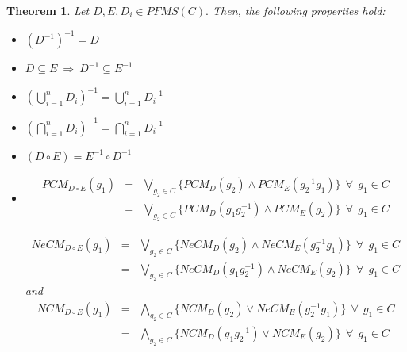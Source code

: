 \documentclass[10pt,a4paper]{amsart}
\newtheorem{theorem}{Theorem}
\newcommand{\dis}{\displaystyle}
\begin{document}
\begin{theorem}
Let $D, E, D_i \in PFMS(C).$ Then, the following properties hold:
\begin{itemize}
\item [i.] $(D^{-1})^{-1} = D$
\item [ii.] $D \subseteq E~\Rightarrow~D^{-1} \subseteq E^{-1}$
\item [iii.] $ \dis \left(\bigcup^n_{i = 1} D_i\right)^{-1} = \bigcup^n_{i = 1} D_i^{-1}$
\item [iv.] $\dis \left(\bigcap^n_{i = 1} D_i\right)^{-1} = \bigcap^n_{i = 1} D_i^{-1}$
\item [v.] $(D \circ E) = E^{-1} \circ D^{-1}$
\item [vi.] 
\begin{eqnarray*}
PCM_{D \circ E}(g_1) & = & \bigvee_{g_2 \in C} \lbrace PCM_D(g_2) \wedge PCM_E(g_2^{-1}g_1)\rbrace~~ \forall~~ g_1 \in C\\
& = & \bigvee_{g_2 \in C} \lbrace PCM_D(g_1 g^{-1}_2) \wedge PCM_E(g_2)\rbrace~~ \forall~~ g_1 \in C
\end{eqnarray*}

\begin{eqnarray*}
NeCM_{D \circ E}(g_1) & = & \bigvee_{g_2 \in C} \lbrace NeCM_D(g_2) \wedge NeCM_E(g_2^{-1}g_1)\rbrace~~ \forall~~ g_1 \in C\\
& = & \bigvee_{g_2 \in C} \lbrace NeCM_D(g_1 g^{-1}_2) \wedge NeCM_E(g_2)\rbrace~~ \forall~~ g_1 \in C
\end{eqnarray*}
and 
\begin{eqnarray*}
NCM_{D \circ E}(g_1) & = & \bigwedge_{g_2 \in C} \lbrace NCM_D(g_2) \vee NeCM_E(g_2^{-1}g_1)\rbrace~~ \forall~~ g_1 \in C\\
& = & \bigwedge_{g_2 \in C} \lbrace NCM_D(g_1 g^{-1}_2) \vee NCM_E(g_2)\rbrace~~ \forall~~ g_1 \in C
\end{eqnarray*}
\end{itemize} 
\end{theorem}
\end{document}
